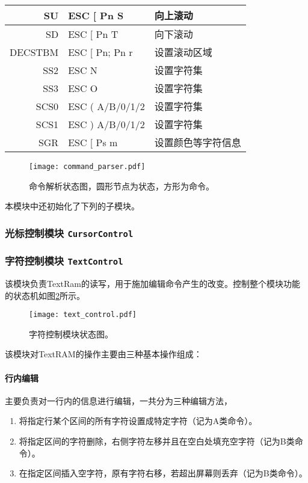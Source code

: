 \begin{longtable}{|r|l|l|}
SU & ESC [ Pn S &向上滚动 \\ \hline
SD & ESC [ Pn T &向下滚动 \\ \hline
DECSTBM & ESC [ Pn; Pn r &设置滚动区域 \\ \hline \hline

SS2 & ESC N&设置字符集 \\ \hline
SS3 & ESC O&设置字符集 \\ \hline
SCS0 & ESC ( A/B/0/1/2 & 设置字符集 \\ \hline
SCS1 & ESC ) A/B/0/1/2 &设置字符集 \\ \hline \hline

SGR & ESC [ Ps m &设置颜色等字符信息 \\ \hline
\end{longtable}

\begin{landscape}
\begin{figure}[htbp]
\centerline{
\texttt{[image: command\_parser.pdf]}
}
\caption{命令解析状态图，圆形节点为状态，方形为命令。}
\label{fig:command_parser}
\end{figure}
\end{landscape}

本模块中还初始化了下列的子模块。

\subsubsection{光标控制模块 \texttt{CursorControl}}
\subsubsection{字符控制模块 \texttt{TextControl}}
该模块负责TextRam的读写，用于施加编辑命令产生的改变。控制整个模块功能的状态机如图\ref{fig:text_control}所示。

\begin{figure}[htbp]
\centerline{
\texttt{[image: text\_control.pdf]}
}
\caption{字符控制模块状态图。}
\label{fig:text_control}
\end{figure}

该模块对TextRAM的操作主要由三种基本操作组成：

\paragraph{行内编辑}
主要负责对一行内的信息进行编辑，一共分为三种编辑方法，
\begin{enumerate}
	\item 将指定行某个区间的所有字符设置成特定字符（记为A类命令）。
	\item 将指定区间的字符删除，右侧字符左移并且在空白处填充空字符（记为B类命令）。
	\item 在指定区间插入空字符，原有字符右移，若超出屏幕则丢弃（记为B类命令）。
\end{enumerate}


